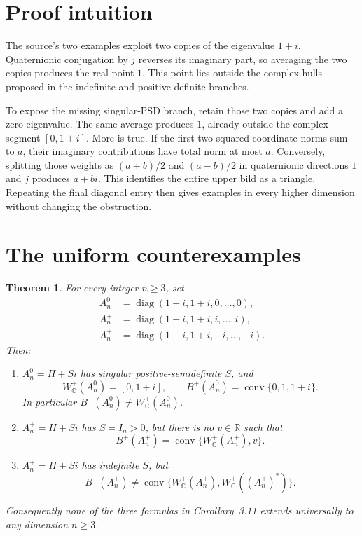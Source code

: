 \documentclass[11pt]{article}
\newtheorem{theorem}{Theorem}
\newcommand{\C}{\mathbb C}
\newcommand{\R}{\mathbb R}
\newcommand{\conv}{\operatorname{conv}}
\newcommand{\diag}{\operatorname{diag}}
\begin{document}
\section{Proof intuition}

The source's two examples exploit two copies of the eigenvalue $1+i$.
Quaternionic conjugation by $j$ reverses its imaginary part, so averaging the
two copies produces the real point $1$.  This point lies outside the complex
hulls proposed in the indefinite and positive-definite branches.

To expose the missing singular-PSD branch, retain those two copies and add a
zero eigenvalue.  The same average produces $1$, already outside the complex
segment $[0,1+i]$.  More is true.  If the first two squared coordinate norms
sum to $a$, their imaginary contributions have total norm at most $a$.
Conversely, splitting those weights as $(a+b)/2$ and $(a-b)/2$ in quaternionic
directions $1$ and $j$ produces $a+bi$.  This identifies the entire upper bild
as a triangle.  Repeating the final diagonal entry then gives examples in
every higher dimension without changing the obstruction.

\section{The uniform counterexamples}

\begin{theorem}\label{thm:main}
For every integer $n\geq3$, set
\begin{align*}
 A_n^0&=\diag(1+i,1+i,0,\ldots,0),\\
 A_n^+&=\diag(1+i,1+i,i,\ldots,i),\\
 A_n^{\pm}&=\diag(1+i,1+i,-i,\ldots,-i).
\end{align*}
Then:
\begin{enumerate}
\item $A_n^0=H+Si$ has singular positive-semidefinite $S$, and
\[
 W_{\C}^+(A_n^0)=[0,1+i],\qquad
 B^+(A_n^0)=\conv\{0,1,1+i\}.
\]
In particular $B^+(A_n^0)\ne W_{\C}^+(A_n^0)$.
\item $A_n^+=H+Si$ has $S=I_n>0$, but there is no $v\in\R$ such that
\[
 B^+(A_n^+)=\conv\{W_{\C}^+(A_n^+),v\}.
\]
\item $A_n^{\pm}=H+Si$ has indefinite $S$, but
\[
 B^+(A_n^{\pm})\ne
 \conv\{W_{\C}^+(A_n^{\pm}),W_{\C}^+((A_n^{\pm})^*)\}.
\]
\end{enumerate}
Consequently none of the three formulas in Corollary~3.11 extends
universally to any dimension $n\geq3$.
\end{theorem}
\end{document}
